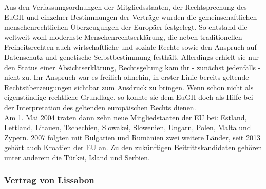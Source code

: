 \documentclass[letterpaper, 12pt]{article}
\let\tempsubsubsection\subsubsection
\renewcommand\subsubsection[1]{\vspace{0cm}\tempsubsubsection{#1}\vspace{0cm}}
\begin{document}
Aus den Verfassungsordnungen der Mitgliedsstaaten, der Rechtsprechung des EuGH und einzelner Bestimmungen der Verträge wurden die gemeinschaftlichen menschenrechtlichen Überzeugungen der Europäer festgelegt. So entstand die weltweit wohl modernste Menschenrechtserklärung, die neben traditionellen Freiheitsrechten auch wirtschaftliche und soziale Rechte sowie den Anspruch auf Datenschutz und genetische Selbstbestimmung festhält. \clearpage
Allerdings erhielt sie nur den Status einer Absichtserklärung, Rechtsgeltung kam ihr - zunächst jedenfalls - nicht zu. Ihr Anspruch war es freilich ohnehin, in erster Linie bereits geltende Rechtsüberzeugungen sichtbar zum Ausdruck zu bringen. Wenn schon nicht als eigenständige rechtliche Grundlage, so konnte sie dem EuGH doch als Hilfe bei der Interpretation des geltenden europäischen Rechts dienen. \\
Am 1. Mai 2004 traten dann zehn neue Mitgliedstaaten der EU bei: Estland, Lettland, Litauen, Tschechien, Slowakei, Slowenien, Ungarn, Polen, Malta und Zypern. 2007 folgten mit Bulgarien und Rumänien zwei weitere Länder, seit 2013 gehört auch Kroatien der EU an. Zu den zukünftigen Beitrittskandidaten gehören unter anderem die Türkei, Island und Serbien.

\subsubsection{Vertrag von Lissabon}
\end{document}
